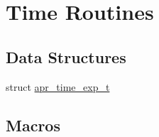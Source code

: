 \hypertarget{group__apr__time}{}\section{Time Routines}
\label{group__apr__time}
\subsection*{Data Structures}
\begin{DoxyCompactItemize}
\item 
struct \hyperlink{structapr__time__exp__t}{apr\+\_\+time\+\_\+exp\+\_\+t}
\end{DoxyCompactItemize}
\subsection*{Macros}

